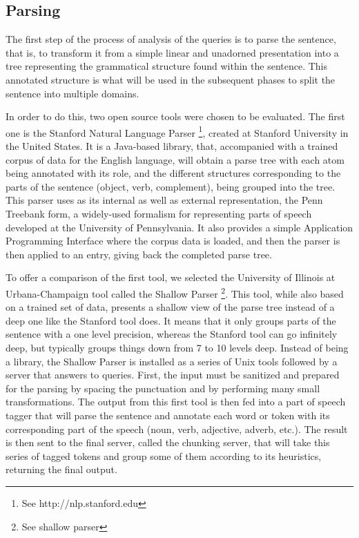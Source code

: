 \subsection{Parsing} %
\label{sub:parsing}

The first step of the process of analysis of the queries is to parse the sentence, that is, to transform it from a simple linear and unadorned presentation into a tree representing the grammatical structure found within the sentence. This annotated structure is what will be used in the subsequent phases to split the sentence into multiple domains.

In order to do this, two open source tools were chosen to be evaluated. The first one is the Stanford Natural Language Parser \footnote{See http://nlp.stanford.edu}, created at Stanford University in the United States. It is a Java-based library, that, accompanied with a trained corpus of data for the English language, will obtain a parse tree with each atom being annotated with its role, and the different structures corresponding to the parts of the sentence (object, verb, complement), being grouped into the tree. This parser uses as its internal as well as external representation, the Penn Treebank form, a widely-used formalism for representing parts of speech developed at the University of Pennsylvania. It also provides a simple Application Programming Interface where the corpus data is loaded, and then the parser is then applied to an entry, giving back the completed parse tree.

To offer a comparison of the first tool, we selected the University of Illinois at Urbana-Champaign tool called the Shallow Parser \footnote{See shallow parser}. This tool, while also based on a trained set of data, presents a shallow view of the parse tree instead of a deep one like the Stanford tool does. It means that it only groups parts of the sentence with a one level precision, whereas the Stanford tool can go infinitely deep, but typically groups things down from 7 to 10 levels deep. Instead of being a library, the Shallow Parser is installed as a series of Unix tools followed by a server that answers to queries. First, the input must be sanitized and prepared for the parsing by spacing the punctuation and by performing many small transformations. The output from this first tool is then fed into a part of speech tagger that will parse the sentence and annotate each word or token with its corresponding part of the speech (noun, verb, adjective, adverb, etc.). The result is then sent to the final server, called the chunking server, that will take this series of tagged tokens and group some of them according to its heuristics, returning the final output.

